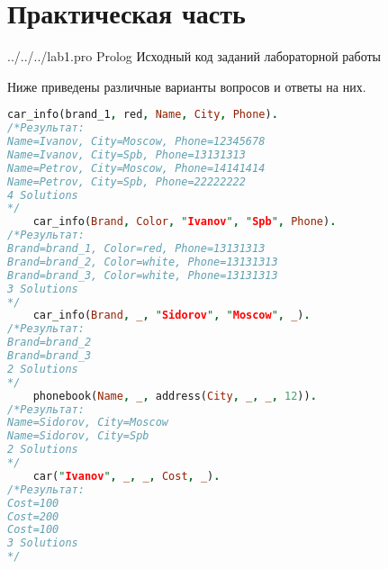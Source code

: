 \chapter*{Практическая часть}

	{../../../lab1.pro} %
	{Prolog} %
	{Исходный код заданий лабораторной работы} %

Ниже приведены различные варианты вопросов и ответы на них.
\begin{lstlisting}[language=Prolog]
	car_info(brand_1, red, Name, City, Phone).
/*Результат:
Name=Ivanov, City=Moscow, Phone=12345678
Name=Ivanov, City=Spb, Phone=13131313
Name=Petrov, City=Moscow, Phone=14141414
Name=Petrov, City=Spb, Phone=22222222
4 Solutions
*/
	car_info(Brand, Color, "Ivanov", "Spb", Phone).
/*Результат:
Brand=brand_1, Color=red, Phone=13131313
Brand=brand_2, Color=white, Phone=13131313
Brand=brand_3, Color=white, Phone=13131313
3 Solutions
*/
	car_info(Brand, _, "Sidorov", "Moscow", _).
/*Результат:
Brand=brand_2
Brand=brand_3
2 Solutions
*/
	phonebook(Name, _, address(City, _, _, 12)).
/*Результат:
Name=Sidorov, City=Moscow
Name=Sidorov, City=Spb
2 Solutions
*/
	car("Ivanov", _, _, Cost, _).
/*Результат:
Cost=100
Cost=200
Cost=100
3 Solutions
*/
\end{lstlisting}
